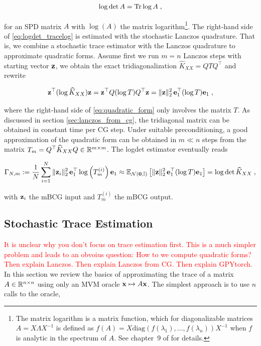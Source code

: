 \documentclass{article}
\begin{document}
{\begin{equation} \label{eq:logdet_tracelog}
    \log\det A = \operatorname{Tr}\log A \; ,
\end{equation}

for an SPD matrix $A$ with $\log(A)$ the matrix logarithm\footnote{The matrix logarithm is a matrix function, which for diagonalizable matrices $A = X\Lambda X^{-1}$ is defined as $f(A) = X\text{diag}(f(\lambda_1), \ldots, f(\lambda_n)) X^{-1}$ when $f$ is analytic in the spectrum of $A$. See chapter~9 of \cite{golub_matrix_2013} for details.}. %
The right-hand side of \eqref{eq:logdet_tracelog} is estimated with the stochastic Lanczos quadrature. That is, we combine a stochastic trace estimator with the Lanczos quadrature to approximate quadratic forms. Assume first we run $m = n$ Lanczos steps with starting vector $\boldsymbol{\mathbf{z}}$, we obtain the exact tridiagonalization $\widehat K_{XX} = Q T Q^\top$ and rewrite 

\begin{equation} \label{eq:quadratic_form}
    \boldsymbol{\mathbf{z}}^\top (\log \widehat K_{XX}) \boldsymbol{\mathbf{z}} = \boldsymbol{\mathbf{z}}^\top Q (\log T) Q^\top \boldsymbol{\mathbf{z}} = \Vert \boldsymbol{\mathbf{z}} \Vert_2^2 \, \boldsymbol{\mathbf{e}}_1^\top (\log T) \boldsymbol{\mathbf{e}}_1 \; ,
\end{equation}

where the right-hand side of \eqref{eq:quadratic_form} only involves the matrix $T$. As discussed in section \ref{sec:lanczos_from_cg}, the tridiagonal matrix can be obtained in constant time per CG step. Under suitable preconditioning, a good approximation of the quadratic form can be obtained in $m \ll n$ steps from the matrix $T_m = Q^\top \widehat K_{XX} Q \in \mathbb R^{m\times m}$. The logdet estimator eventually reads

\begin{equation} \label{eq:logdet_estimator}
    \Gamma_{N, m} := \frac{1}{N} \sum_{i=1}^N \norm{\vect z_i}_2^2 \, \vect e_1^\top \log \left(T_m^{(i)} \right) \vect e_1 \approx \E_{\mathcal N(\vect 0, \Id)} \left[ \norm{\vect z}_2^2 \, \vect e_1^\top (\log T) \vect e_1 \right] = \log \det \widehat K_{XX} \; ,
\end{equation}

with $\boldsymbol{\mathbf{z}}_i$ the mBCG input and $T_m^{(i)}$ the mBCG output.

\subsection{Stochastic Trace Estimation} \label{sec:stoch_trace_estimation}
\textcolor{red}{It is unclear why you don't focus on trace estimation first. This is a much simpler problem and leads to an obvoius question: How to we compute quadratic forms? Then explain Lanczos. Then explain Lanczos from CG. Then explain GPYtorch.}
In this section we review the basics of approximating the trace of a matrix $A \in \mathbb R^{n\times n}$ using only an MVM oracle $\boldsymbol{\mathbf{x}} \mapsto A\boldsymbol{\mathbf{x}}$. The simplest approach is to use $n$ calls to the oracle,

}
\end{document}
